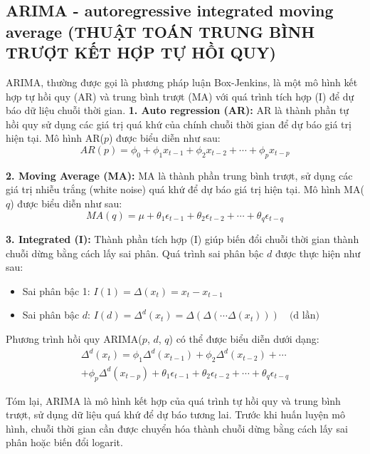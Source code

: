 \documentclass[conference]{IEEEtran}
\begin{document}
	\subsection{ARIMA - autoregressive integrated moving average (THUẬT TOÁN TRUNG BÌNH TRƯỢT KẾT HỢP TỰ HỒI QUY)}
	ARIMA, thường được gọi là phương pháp luận Box-Jenkins, là một mô hình kết hợp tự hồi quy (AR) và trung bình trượt (MA) với quá trình tích hợp (I) để dự báo dữ liệu chuỗi thời gian. 
	\textbf{1. Auto regression (AR):} 
	AR là thành phần tự hồi quy sử dụng các giá trị quá khứ của chính chuỗi thời gian để dự báo giá trị hiện tại. Mô hình AR($p$) được biểu diễn như sau:
	\begin{equation}
		AR(p) = \phi_0 + \phi_1 x_{t-1} + \phi_2 x_{t-2} + \cdots + \phi_p x_{t-p}
	\end{equation}
	
	\textbf{2. Moving Average (MA):}
	MA là thành phần trung bình trượt, sử dụng các giá trị nhiễu trắng (white noise) quá khứ để dự báo giá trị hiện tại. Mô hình MA($q$) được biểu diễn như sau:
	\begin{equation}
		MA(q) = \mu + \theta_1 \epsilon_{t-1} + \theta_2 \epsilon_{t-2} + \cdots + \theta_q \epsilon_{t-q}
	\end{equation}
	
	\textbf{3. Integrated (I):}
	Thành phần tích hợp (I) giúp biến đổi chuỗi thời gian thành chuỗi dừng bằng cách lấy sai phân. Quá trình sai phân bậc $d$ được thực hiện như sau:
	\begin{itemize}
		\item Sai phân bậc 1: $I(1) = \Delta(x_t) = x_t - x_{t-1}$
		\item Sai phân bậc $d$: $I(d) = \Delta^d(x_t) = \Delta(\Delta(\cdots \Delta(x_t))) \quad \text{(d lần)}$
	\end{itemize}
	
	Phương trình hồi quy ARIMA($p$, $d$, $q$) có thể được biểu diễn dưới dạng:
	\begin{multline}
		\Delta^d(x_t) = \phi_1 \Delta^d(x_{t-1}) + \phi_2 \Delta^d(x_{t-2}) + \cdots \\
		+ \phi_p \Delta^d(x_{t-p}) + \theta_1 \epsilon_{t-1} + \theta_2 \epsilon_{t-2} + \cdots + \theta_q \epsilon_{t-q}
	\end{multline}
	
	
	Tóm lại, ARIMA là mô hình kết hợp của quá trình tự hồi quy và trung bình trượt, sử dụng dữ liệu quá khứ để dự báo tương lai. Trước khi huấn luyện mô hình, chuỗi thời gian cần được chuyển hóa thành chuỗi dừng bằng cách lấy sai phân hoặc biến đổi logarit.
	
\end{document}
